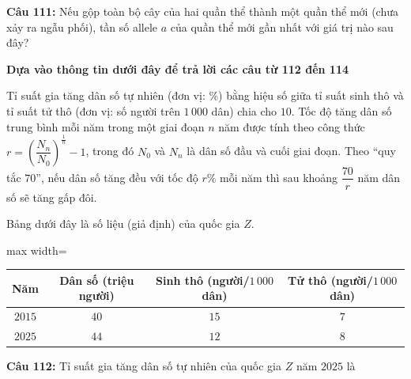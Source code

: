 \documentclass[12pt,a4paper]{article}
\begin{document}
\noindent \textbf{Câu 111:} Nếu gộp toàn bộ cây của hai quần thể thành một quần thể mới (chưa xảy ra ngẫu phối), tần số allele $a$ của quần thể mới gần nhất với giá trị nào sau đây?\\
\noindent{}



\vspace{0.5cm}
\noindent\textbf{Dựa vào thông tin dưới đây để trả lời các câu từ 112 đến 114}%


\par\nobreak

Tỉ suất gia tăng dân số tự nhiên (đơn vị: \%) bằng hiệu số giữa tỉ suất sinh thô và tỉ suất tử thô (đơn vị: số người trên $1\,000$ dân) chia cho $10$. Tốc độ tăng dân số trung bình mỗi năm trong một giai đoạn $n$ năm được tính theo công thức $r=\left(\dfrac{N_n}{N_0}\right)^{\frac1n}-1$, trong đó $N_0$ và $N_n$ là dân số đầu và cuối giai đoạn. Theo ``quy tắc $70$'', nếu dân số tăng đều với tốc độ $r\%$ mỗi năm thì sau khoảng $\dfrac{70}{r}$ năm dân số sẽ tăng gấp đôi.

Bảng dưới đây là số liệu (giả định) của quốc gia $Z$.

\begin{center}
\begin{adjustbox}{max width=\linewidth}
\begin{tabular}{|c|c|c|c|}
\hline
Năm & Dân số (triệu người) & Sinh thô (người/$1\,000$ dân) & Tử thô (người/$1\,000$ dân) \\ \hline
$2015$ & $40$ & $15$ & $7$ \\ \hline
$2025$ & $44$ & $12$ & $8$ \\ \hline
\end{tabular}
\end{adjustbox}
\end{center}

\par\nobreak


\noindent \textbf{Câu 112:} Tỉ suất gia tăng dân số tự nhiên của quốc gia $Z$ năm $2025$ là\\
\noindent{}
\end{document}
